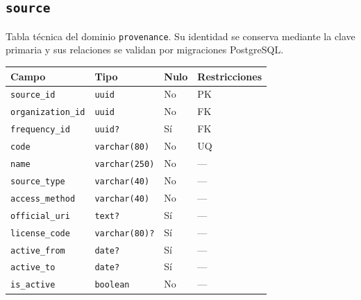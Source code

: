 \documentclass[11pt]{article}
\begin{document}
\subsection{\texttt{source}}
Tabla técnica del dominio \texttt{provenance}. Su identidad se conserva mediante la clave primaria y sus relaciones se validan por migraciones PostgreSQL.
\begin{longtable}{>{\raggedright\arraybackslash}p{} p{} p{} p{}}
\toprule Campo & Tipo & Nulo & Restricciones \\ \midrule\endhead
\texttt{source\_id} & \texttt{uuid} & No & PK \\
\texttt{organization\_id} & \texttt{uuid} & No & FK \\
\texttt{frequency\_id} & \texttt{uuid?} & Sí & FK \\
\texttt{code} & \texttt{varchar(80)} & No & UQ \\
\texttt{name} & \texttt{varchar(250)} & No & --- \\
\texttt{source\_type} & \texttt{varchar(40)} & No & --- \\
\texttt{access\_method} & \texttt{varchar(40)} & No & --- \\
\texttt{official\_uri} & \texttt{text?} & Sí & --- \\
\texttt{license\_code} & \texttt{varchar(80)?} & Sí & --- \\
\texttt{active\_from} & \texttt{date?} & Sí & --- \\
\texttt{active\_to} & \texttt{date?} & Sí & --- \\
\texttt{is\_active} & \texttt{boolean} & No & --- \\
\bottomrule\end{longtable}
\end{document}
